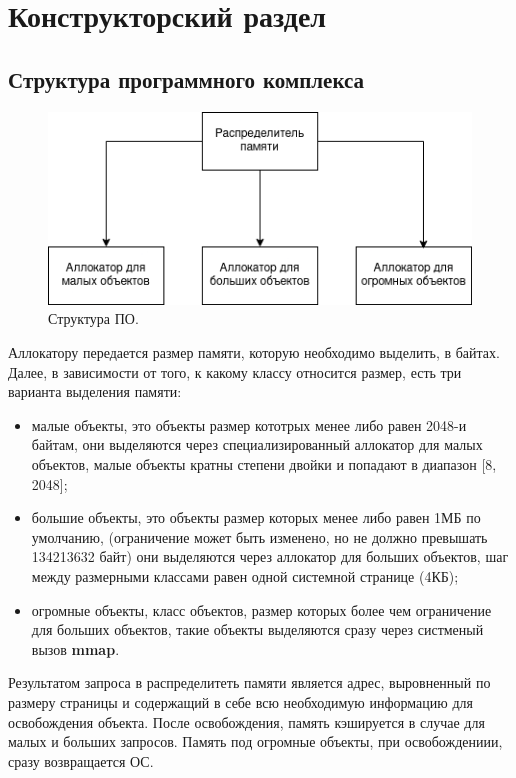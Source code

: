 \chapter{Конструкторский раздел}
\section{Структура программного комплекса}

\begin{figure}[!h]
	\begin{center}
		\includegraphics[scale=0.5]{images/structure.png}
		\caption{Структура ПО.}
		\label{structure}
	\end{center}
\end{figure}

Аллокатору передается размер памяти, которую необходимо выделить, в байтах. Далее, в зависимости от того, к какому классу относится размер, есть три варианта выделения памяти:
\begin{itemize}
	\item малые объекты, это объекты размер кототрых менее либо равен 2048-и байтам, они выделяются через специализированный аллокатор для малых объектов, малые объекты кратны степени двойки и попадают в диапазон [8, 2048];
	\item большие объекты, это объекты размер которых менее либо равен 1МБ по умолчанию, (ограничение может быть изменено, но не должно превышать 134213632 байт) они выделяются через аллокатор для больших объектов, шаг между размерными классами равен одной системной странице (4КБ);
	\item огромные объекты, класс объектов, размер которых более чем ограничение для больших объектов, такие объекты выделяются сразу через систменый вызов \textbf{mmap}.
\end{itemize}

Результатом запроса в распределитеть памяти является адрес, выровненный по размеру страницы и содержащий в себе всю необходимую информацию для освобождения объекта. После освобождения, память кэшируется в случае для малых и больших запросов. Память под огромные объекты, при освобождениии, сразу возвращается ОС.

